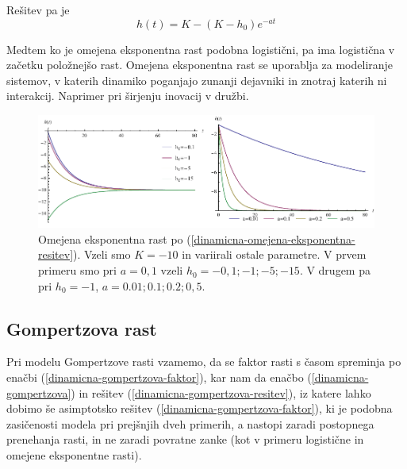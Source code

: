 \documentclass[a4paper, twoside, 12pt]{book}
\begin{document}
    Rešitev pa je
    \begin{equation}
      h(t) = K - (K - h_0) e^{-a t}
      \label{dinamicna-omejena-eksponentna-resitev}
    \end{equation}

    Medtem ko je omejena eksponentna rast podobna logistični, pa ima logistična v začetku položnejšo rast. Omejena eksponentna rast se uporablja za modeliranje sistemov, v katerih dinamiko poganjajo zunanji dejavniki in znotraj katerih ni interakcij. Naprimer pri širjenju inovacij v družbi.

    \begin{figure}[h]
      \begin{center}
        \includegraphics[width=14cm]{slike/omejena-eksponentna-rast}
      \end{center}
      \caption{Omejena eksponentna rast po (\ref{dinamicna-omejena-eksponentna-resitev}). Vzeli smo $K=-10$ in variirali ostale parametre. V prvem primeru smo pri $a=0,1$ vzeli $h_0=-0,1;-1;-5;-15$. V drugem pa pri $h_0=-1$, $a=0.01;0.1;0.2;0,5$.}
      \label{fig:omejena-eksponentna-rast}
    \end{figure}



    \subsection{Gompertzova rast}

    Pri modelu Gompertzove rasti vzamemo, da se faktor rasti s časom spreminja po enačbi (\ref{dinamicna-gompertzova-faktor}), kar nam da enačbo (\ref{dinamicna-gompertzova}) in rešitev (\ref{dinamicna-gompertzova-resitev}), iz katere lahko dobimo še asimptotsko rešitev (\ref{dinamicna-gompertzova-faktor}), ki je podobna zasičenosti modela pri prejšnjih dveh primerih, a nastopi zaradi postopnega prenehanja rasti, in ne zaradi povratne zanke (kot v primeru logistične in omejene eksponentne rasti).
\end{document}
